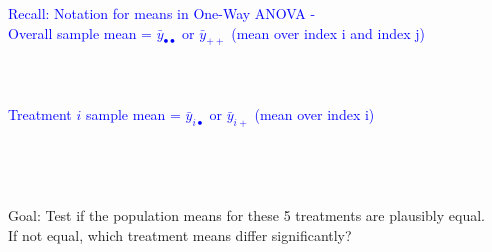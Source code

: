 \textcolor{blue}{Recall:  Notation for means in One-Way ANOVA -\\
Overall sample mean = $\bar{y}_{\bullet\bullet}$ or $\bar{y}_{++}$ (mean over index i and index j)\\~\\~\\~\\
Treatment $i$ sample mean = $\bar{y}_{i\bullet}$ or $\bar{y}_{i+}$ (mean over index i)}\\~\\~\\~\\~\\

Goal: Test if the population means for these 5 treatments are plausibly equal. \\
If not equal, which treatment means differ significantly? 

\newpage

